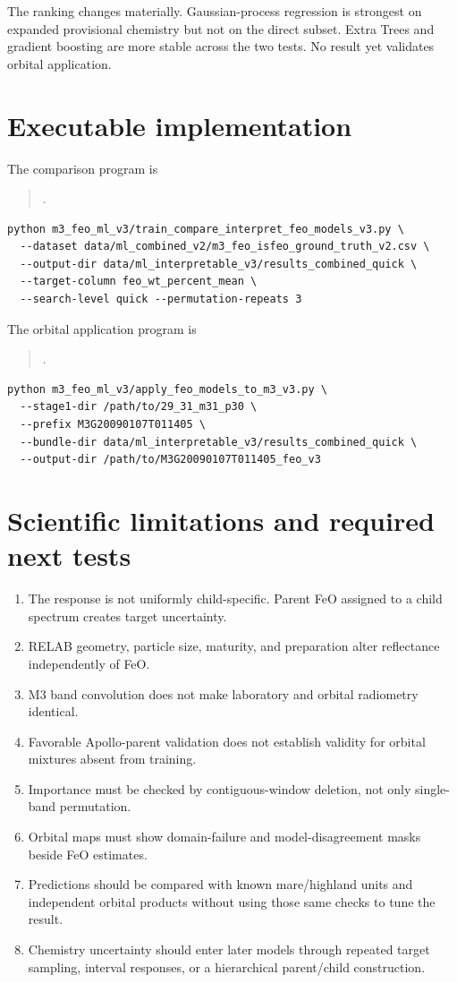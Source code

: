 \documentclass[11pt]{article}
\begin{document}
The ranking changes materially. Gaussian-process regression is strongest on expanded provisional chemistry but not on the direct subset. Extra Trees and gradient boosting are more stable across the two tests. No result yet validates orbital application.

\section{Executable implementation}
The comparison program is
\begin{quote}.\end{quote}
\begin{verbatim}
python m3_feo_ml_v3/train_compare_interpret_feo_models_v3.py \
  --dataset data/ml_combined_v2/m3_feo_isfeo_ground_truth_v2.csv \
  --output-dir data/ml_interpretable_v3/results_combined_quick \
  --target-column feo_wt_percent_mean \
  --search-level quick --permutation-repeats 3
\end{verbatim}
The orbital application program is
\begin{quote}.\end{quote}
\begin{verbatim}
python m3_feo_ml_v3/apply_feo_models_to_m3_v3.py \
  --stage1-dir /path/to/29_31_m31_p30 \
  --prefix M3G20090107T011405 \
  --bundle-dir data/ml_interpretable_v3/results_combined_quick \
  --output-dir /path/to/M3G20090107T011405_feo_v3
\end{verbatim}

\section{Scientific limitations and required next tests}
\begin{enumerate}
 \item The response is not uniformly child-specific. Parent FeO assigned to a child spectrum creates target uncertainty.
 \item RELAB geometry, particle size, maturity, and preparation alter reflectance independently of FeO.
 \item M3 band convolution does not make laboratory and orbital radiometry identical.
 \item Favorable Apollo-parent validation does not establish validity for orbital mixtures absent from training.
 \item Importance must be checked by contiguous-window deletion, not only single-band permutation.
 \item Orbital maps must show domain-failure and model-disagreement masks beside FeO estimates.
 \item Predictions should be compared with known mare/highland units and independent orbital products without using those same checks to tune the result.
 \item Chemistry uncertainty should enter later models through repeated target sampling, interval responses, or a hierarchical parent/child construction.
\end{enumerate}
\end{document}
